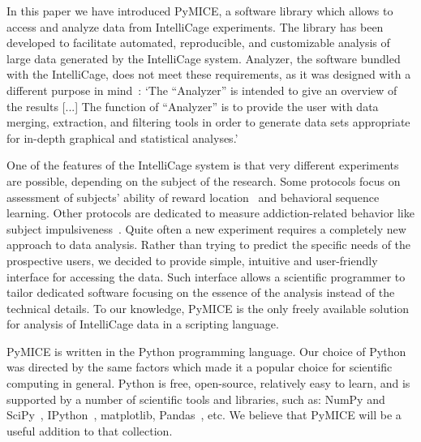 In this paper we have introduced PyMICE, a software library which allows to access
and analyze data from IntelliCage experiments.
%
The library has been developed to
facilitate automated, reproducible, and customizable analysis of large data
generated by the IntelliCage system. Analyzer, the software bundled with the
IntelliCage, does not meet these requirements, as it was designed with a
different purpose in mind~\cite{intelliCagePlusManual2011}:
`The ``Analyzer'' is intended to give an overview of the results [...]
The function of ``Analyzer'' is to provide the user with data merging,
extraction, and filtering tools in order to generate data sets appropriate for
in-depth graphical and statistical analyses.'

One of the features of the IntelliCage system is that very different
experiments are possible, depending on the subject of the research.
Some protocols focus on assessment of subjects' ability of reward
location~\cite{Knapska:2013dj} and behavioral sequence~\cite{Endo:2011bs}
learning. Other protocols are dedicated to measure addiction-related
behavior like subject impulsiveness~\cite{Radwanska:2012fd,Mijakowska:2015io}.
Quite often a new experiment requires a
completely new approach to data analysis. Rather than trying to predict the
specific needs of the prospective users, we decided to provide simple,
intuitive and user-friendly interface for accessing the data. Such interface
allows a scientific programmer to tailor dedicated software focusing on the
essence of the analysis instead of the technical details. To our knowledge,
PyMICE is the only freely available solution for analysis of IntelliCage
data in a scripting language.

PyMICE is written in the Python programming language. Our choice of Python
was directed by the same factors
which made it a popular choice for scientific computing in general.
Python is free,
open-source, relatively easy to learn, and is supported by a number of
scientific tools and libraries, such as: NumPy and SciPy~\cite{Oliphant:2007ud},
IPython~\cite{Perez:2007wf}, matplotlib,
Pandas~\cite{mckinney-proc-scipy-2010}, etc.
We believe that PyMICE will be a useful addition to that collection.

